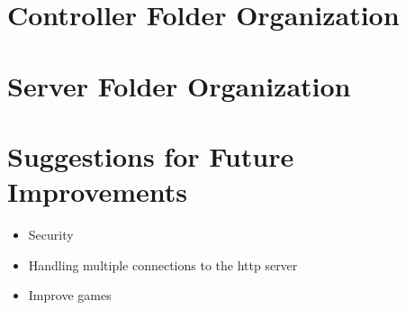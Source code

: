 \documentclass{article}
\begin{document}
\section{Controller Folder Organization}
\section{Server Folder Organization}

\section{Suggestions for Future Improvements}
	\begin{itemize}
		\item Security
		\item Handling multiple connections to the http server
		\item Improve games
	\end{itemize}
\end{document}
